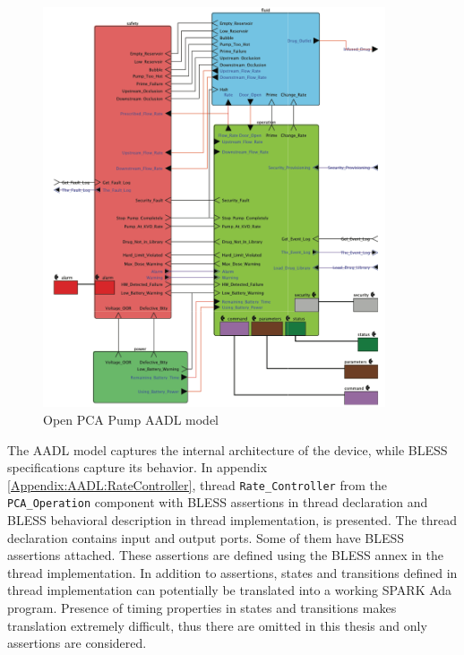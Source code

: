 \begin{figure}%
    \begin{center}
      \includegraphics[width=0.9\textwidth]{figures/pca-pump-aadl-model.png}      
    \end{center}
    \caption{Open PCA Pump AADL model}
    \label{figure:pca-pump-aadl-model}
\end{figure}

The AADL model captures the internal architecture of the device, while BLESS specifications capture its behavior. In appendix \ref{Appendix:AADL:RateController}, thread \lstinline{Rate_Controller} from the \lstinline{PCA_Operation} component with BLESS assertions in thread declaration and BLESS behavioral description in thread implementation, is presented. The thread declaration contains input and output ports. Some of them have BLESS assertions attached. These assertions are defined using the BLESS annex in the thread implementation. In addition to assertions, states and transitions defined in thread implementation can potentially be translated into a working SPARK Ada program. Presence of timing properties in states and transitions makes translation extremely difficult, thus there are omitted in this thesis and only assertions are considered.


